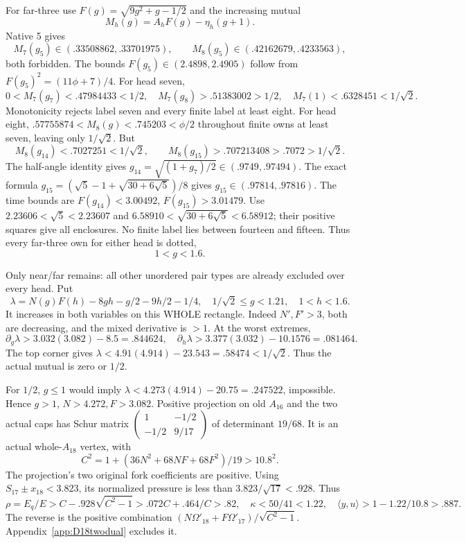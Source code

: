 \documentclass[11pt]{article}
\theoremstyle{definition}
\theoremstyle{remark}
\newcommand{\ip}[2]{\langle #1,#2\rangle}
\begin{document}
For far-three use \(F(g)=\sqrt{9g^2+g-1/2}\) and the increasing
mutual
\[
                 M_h(g)=A_hF(g)-\eta_h(g+1).
\]
Native 5 gives
\[
 M_7(g_5)\in(.33508862,.33701975),\qquad
 M_8(g_5)\in(.42162679,.4233563),
\]
both forbidden.
The bounds \(F(g_5)\in(2.4898,2.4905)\) follow from
\(F(g_5)^2=(11\phi+7)/4\).
For head seven,
\[
 0<M_7(g_7)<.47984433<1/2,\quad
 M_7(g_8)>.51383002>1/2,\quad
 M_7(1)<.6328451<1/\sqrt2 .
\]
Monotonicity rejects label seven and every finite label at least eight.
For head eight,
\(.57755874<M_8(g)<.745203<\phi/2\) throughout finite
owns at least seven, leaving only \(1/\sqrt2\).
But
\[
 M_8(g_{14})<.7027251<1/\sqrt2,\qquad
 M_8(g_{15})>.707213408>.7072>1/\sqrt2 .
\]
The half-angle identity gives \(g_{14}=\sqrt{(1+g_7)/2}
\in(.9749,.97494)\).
The exact formula
\(g_{15}=(\sqrt5-1+\sqrt{30+6\sqrt5})/8\)
gives \(g_{15}\in(.97814,.97816)\).
The time bounds are \(F(g_{14})<3.00492\),
\(F(g_{15})>3.01479\).
Use \(2.23606<\sqrt5<2.23607\) and
\(6.58910<\sqrt{30+6\sqrt5}<6.58912\);
their positive squares give all enclosures.
No finite label lies between fourteen and fifteen.
Thus every far-three own for either head is dotted,
\[
                              1<g<1.6 .
\]

Only near/far remains: all other unordered pair types are already
excluded over every head.
Put
\[
 \lambda=N(g)F(h)-8gh-g/2-9h/2-1/4,\quad
 1/\sqrt2\le g<1.21,\quad1<h<1.6 .
\]
It increases in both variables on this WHOLE rectangle.
Indeed \(N',F'>3\), both are decreasing, and the mixed
derivative is \(>1\).
At the worst extremes,
\[
 \partial_g\lambda>3.032(3.082)-8.5=.844624,\quad
 \partial_h\lambda>3.377(3.032)-10.1576=.081464 .
\]
The top corner gives
\(\lambda<4.91(4.914)-23.543=.58474<1/\sqrt2\).
Thus the actual mutual is zero or \(1/2\).

For \(1/2\), \(g\le1\) would imply
\(\lambda<4.273(4.914)-20.75=.247522\), impossible.
Hence \(g>1\), \(N>4.272,F>3.082\).
Positive projection on old \(A_{16}\) and the two actual caps
has Schur matrix
\(\left(\begin{smallmatrix}1&-1/2\\-1/2&9/17\end{smallmatrix}\right)\)
of determinant \(19/68\).
It is an actual whole-\(A_{18}\) vertex, with
\[
 C^2=1+(36N^2+68NF+68F^2)/19>10.8^2.
\]
The projection's two original fork coefficients are positive.
Using \(S_{17}\pm x_{18}<3.823\), its normalized pressure is
less than \(3.823/\sqrt{17}<.928\).
Thus
\[
 \rho=E_q/E>C-.928\sqrt{C^2-1}
                 >.072C+.464/C>.82,
 \quad\kappa<50/41<1.22,
 \quad\ip yu>1-1.22/10.8>.887 .
\]
The reverse is the positive combination
\((N\Omega'_{18}+F\Omega'_{17})/\sqrt{C^2-1}\).
Appendix~\ref{app:D18twodual} excludes it.
\end{document}
